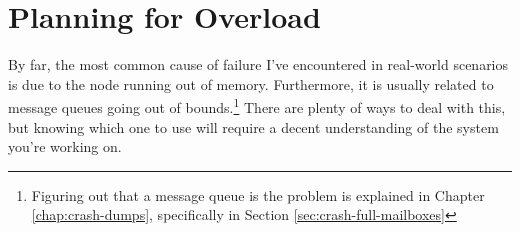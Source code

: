 \documentclass[11pt, oneside]{book}   	%
\begin{document}



\chapter{Planning for Overload}
\label{chap:overload}

By far, the most common cause of failure I've encountered in real-world scenarios is due to the node running out of memory. Furthermore, it is usually related to message queues going out of bounds.\footnote{Figuring out that a message queue is the problem is explained in Chapter \ref{chap:crash-dumps}, specifically in Section \ref{sec:crash-full-mailboxes}} There are plenty of ways to deal with this, but knowing which one to use will require a decent understanding of the system you're working on.
\end{document}
